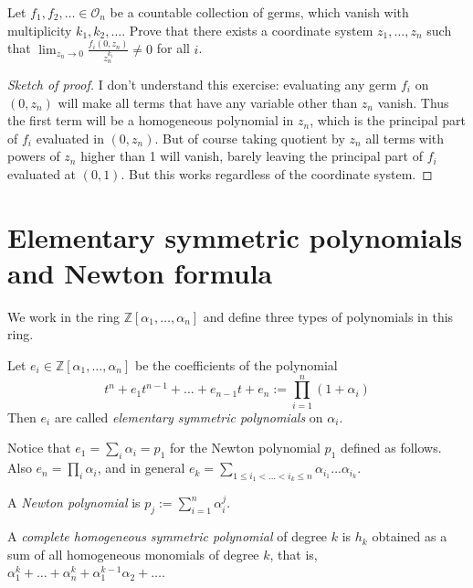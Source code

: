 \begin{exercise}
\label{exercise-principal-parts}
Let $f_1,f_2,\ldots\in \mathcal{O}_n$ be a countable collection of germs, which
vanish with multiplicity $k_1,k_2,\ldots$. Prove that there exists a coordinate
system $z_1,\ldots,z_n$ such that 
$\lim_{z_n\to 0} \frac{f_i(0,z_n)}{z_n^{k_i}}\neq 0$ for all $i$.
\end{exercise}

\begin{proof}[Sketch of proof]
I don't understand this exercise: evaluating any germ $f_i$ on $(0,z_n)$ will
make all terms that have any variable other than $z_n$ vanish. Thus the first
term will be a homogeneous polynomial in $z_n$, which is the principal part of
$f_i$ evaluated in $(0,z_n)$. But of course taking quotient by $z_n$ all terms
with powers of $z_n$ higher than 1 will vanish, barely leaving the principal
part of $f_i$ evaluated at $(0,1)$. But this works regardless of the coordinate
system.
\end{proof}

\section{Elementary symmetric polynomials and Newton formula}
\label{section-elementary-symmetric-polynomials-and-Newton-formula}

We work in the ring $\mathbb{Z}[\alpha_1,\ldots,\alpha_n]$ and define three
types of polynomials in this ring.

\begin{definition}
\label{definition-symmetric-polynomial}
Let $e_i \in \mathbb{Z}[\alpha_1,\ldots,\alpha_n]$ be the coefficients of the
polynomial 
$$
t^n+e_1t^{n-1}+\ldots+e_{n-1}t+e_n:=\prod_{i=1}^n(1+\alpha_i)
$$ Then $e_i$ are called {\it elementary
symmetric polynomials} on $\alpha_i$.
\end{definition}

Notice that $e_1=\sum_i\alpha_i=p_1$ for the Newton polynomial $p_1$ defined as
follows. Also $e_n=\prod_{i}\alpha_i$, and in general $e_k=\sum_{1\leq
i_1<\ldots<i_k\leq n}\alpha_{i_1}\ldots\alpha_{i_k}$.

\begin{definition}
\label{definition-Newton-polynomial}
A {\it Newton polynomial} is $p_j:=\sum_{i=1}^n\alpha_i^j$.
\end{definition}

\begin{definition}
\label{definition-complete-homogeneous-symmetric-polynomial}
A {\it complete homogeneous symmetric polynomial} of degree $k$ is $h_k$
obtained as a sum of all homogeneous monomials of degree $k$, that is,
$\alpha_1^k+\ldots+\alpha_n^k+\alpha_1^{k-1}\alpha_2+\ldots$.
\end{definition}

